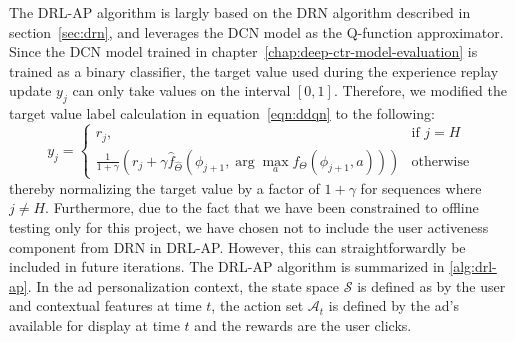 \documentclass{mldsmsc}
\begin{document}
The DRL-AP algorithm is largly based on the DRN algorithm described in section~\ref{sec:drn},
and leverages the DCN model as the Q-function approximator. Since the DCN model trained in 
chapter~\ref{chap:deep-ctr-model-evaluation} is trained as a binary classifier, the target
value used during the experience replay update $y_j$ can only take values on the interval $[0,1]$.
Therefore, we modified
the target value label calculation in equation~\ref{eqn:ddqn} to the following:
\begin{equation}
    \label{eqn:drl-ap-target}
    y_j = 
    \begin{cases} 
        r_j, & \text{if } j=H\\ 
        \frac{1}{1+\gamma}\left(r_j + \gamma \hat{f}_{\hat{\Theta}}(\phi_{j+1},\arg \max_{a}f_{\Theta}(\phi_{j+1},a))\right) & \text{otherwise} 
    \end{cases}
\end{equation}
thereby normalizing the target value by a factor of $1+\gamma$ for sequences
where $j\neq H$. Furthermore, due to the fact that we have been constrained
to offline testing only for this project, we have chosen not to include the
user activeness component from DRN in DRL-AP. However, this can straightforwardly
be included in future iterations. The DRL-AP algorithm is summarized in \ref{alg:drl-ap}. In
the ad personalization context, the state space $\mathcal{S}$ is defined as by the
user and contextual features at time $t$, the action set $\mathcal{A}_t$ is defined
by the ad's available for display at time $t$ and the rewards are the user clicks.
\end{document}
